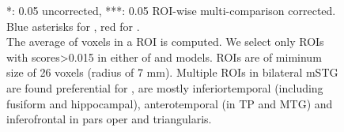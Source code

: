 \begin{figure}
    \centering
    \caption[  ROI Contrast, Group]{*: 0.05 uncorrected, ***: 0.05 ROI-wise multi-comparison corrected. Blue asterisks for , red for .\\ The average  of voxels in a ROI is computed. We select only ROIs with scores>0.015 in either of  and  models. ROIs are of miminum size of 26 voxels (radius of 7 mm). Multiple ROIs in bilateral mSTG are found preferential for ,  are mostly inferiortemporal (including fusiform and hippocampal), anterotemporal (in TP and MTG) and inferofrontal in pars oper and triangularis.} 
    \label{fig:SIG_ASN_ROI}
\end{figure}
